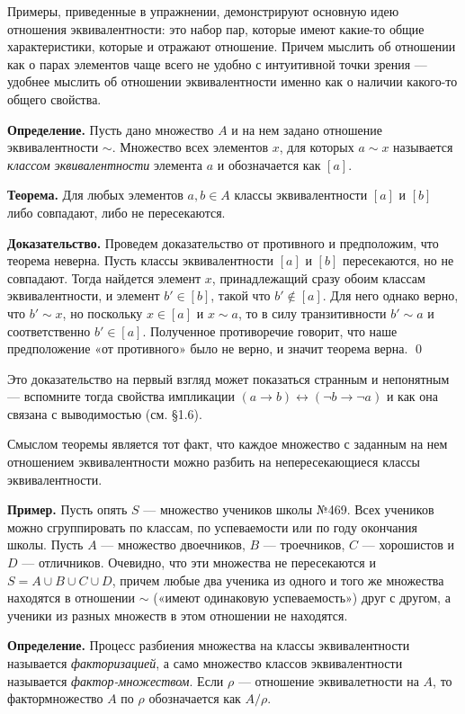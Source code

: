 Примеры, приведенные в упражнении, демонстрируют основную идею отношения эквивалентности: это набор пар, которые имеют какие-то общие характеристики, которые и отражают отношение. Причем мыслить об отношении как о парах элементов чаще всего не удобно с интуитивной точки зрения — удобнее мыслить об отношении эквивалентности именно как о наличии какого-то общего свойства.

{\bfseries Определение.} Пусть дано множество $A$ и на нем задано отношение эквивалентности $\sim$. Множество всех элементов $x$, для которых $a\sim x$ называется {\slshape классом эквивалентности} элемента $a$ и обозначается как $[a]$.

{\bfseries Теорема.} Для любых элементов $a, b \in A$ классы эквивалентности $[a]$ и $[b]$ либо совпадают, либо не пересекаются.

{\bfseries Доказательство.} Проведем доказательство от противного и предположим, что теорема неверна. Пусть классы эквивалентности $[a]$ и $[b]$ пересекаются, но не совпадают. Тогда найдется элемент $x$, принадлежащий сразу обоим классам эквивалентности, и элемент $b' \in [b]$, такой что $b' \not\in [a]$. Для него однако верно, что $b' \sim x$, но поскольку $x \in [a]$ и $x\sim a$, то в силу транзитивности $b' \sim a$ и соответственно $b' \in [a]$. Полученное противоречие говорит, что наше предположение «от противного» было не верно, и значит теорема верна. \qed

Это доказательство на первый взгляд может показаться странным и непонятным — вспомните тогда свойства импликации $(a\rightarrow b) \leftrightarrow (\neg b \rightarrow \neg a)$ и как она связана с выводимостью (см. §1.6).

Смыслом теоремы является тот факт, что каждое множество с заданным на нем отношением эквивалентности можно разбить на непересекающиеся классы эквивалентности.

{\bfseries Пример.} Пусть опять $S$ — множество учеников школы №469. Всех учеников можно сгруппировать по классам, по успеваемости или по году окончания школы. Пусть $A$ — множество двоечников, $B$ — троечников, $C$ — хорошистов и $D$ — отличников. Очевидно, что эти множества не пересекаются и $S = A\cup B\cup C\cup D$, причем любые два ученика из одного и того же множества находятся в отношении $\sim$ («имеют одинаковую успеваемость») друг с другом, а ученики из разных множеств в этом отношении не находятся.

{\bfseries Определение.} Процесс разбиения множества на классы эквивалентности называется {\slshape факторизацией}, а само множество классов эквивалентности называется {\slshape фактор-множеством}. Если $\rho$ — отношение эквивалетности на $A$, то фактормножество $A$ по $\rho$ обозначается как $A/\rho$.

